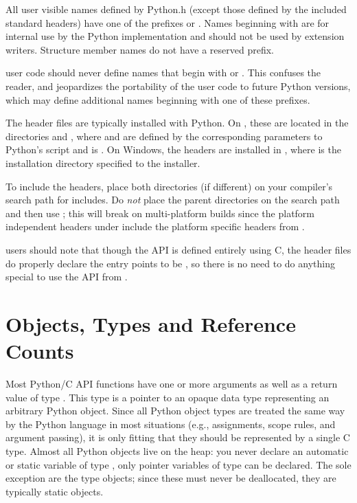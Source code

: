 All user visible names defined by Python.h (except those defined by
the included standard headers) have one of the prefixes  or
.  Names beginning with  are for internal use by
the Python implementation and should not be used by extension writers.
Structure member names do not have a reserved prefix.

 user code should never define names that begin
with  or .  This confuses the reader, and
jeopardizes the portability of the user code to future Python
versions, which may define additional names beginning with one of
these prefixes.

The header files are typically installed with Python.  On \UNIX, these 
are located in the directories
 and
, where
 and  are defined by the
corresponding parameters to Python's  script and
 is .  On Windows, the headers are
installed in , where  is
the installation directory specified to the installer.

To include the headers, place both directories (if different) on your
compiler's search path for includes.  Do \emph{not} place the parent
directories on the search path and then use
; this will break on
multi-platform builds since the platform independent headers under
 include the platform specific headers from
.

\Cpp{} users should note that though the API is defined entirely using
C, the header files do properly declare the entry points to be
, so there is no need to do anything special to use
the API from \Cpp.


\section{Objects, Types and Reference Counts \label{objects}}

Most Python/C API functions have one or more arguments as well as a
return value of type .  This type is a pointer
to an opaque data type representing an arbitrary Python
object.  Since all Python object types are treated the same way by the
Python language in most situations (e.g., assignments, scope rules,
and argument passing), it is only fitting that they should be
represented by a single C type.  Almost all Python objects live on the
heap: you never declare an automatic or static variable of type
, only pointer variables of type  can 
be declared.  The sole exception are the type objects;
since these must never be deallocated, they are typically static
 objects.

